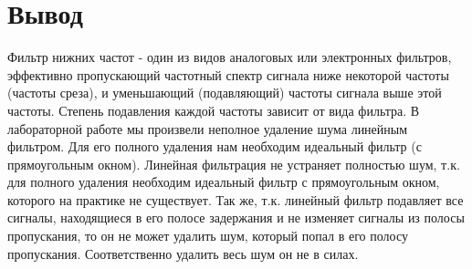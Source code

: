 \documentclass[a4paper, 12pt]{article}
\begin{document}
\section{Вывод}

Фильтр нижних частот - один из видов аналоговых или электронных фильтров, эффективно пропускающий частотный спектр сигнала ниже некоторой частоты (частоты среза), и уменьшающий (подавляющий) частоты сигнала выше этой частоты. Степень подавления каждой частоты зависит от
вида фильтра. В лабораторной работе мы произвели неполное удаление шума линейным фильтром. Для его полного удаления нам необходим идеальный фильтр (с прямоугольным окном). Линейная фильтрация не устраняет
полностью шум, т.к. для полного удаления необходим идеальный фильтр
с прямоугольным окном, которого на практике не существует. Так же, т.к. линейный фильтр подавляет все сигналы, находящиеся в его полосе задержания и не изменяет сигналы из полосы пропускания, то он не может
удалить шум, который попал в его полосу пропускания. Соответственно
удалить весь шум он не в силах.
	
\end{document}
